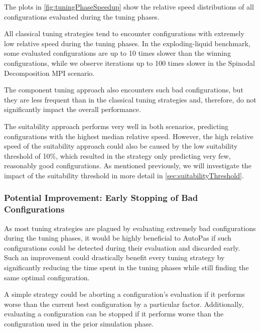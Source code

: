 The plots in \autoref{fig:tuningPhaseSpeedup} show the relative speed distributions of all configurations evaluated during the tuning phases.

All classical tuning strategies tend to encounter configurations with extremely low relative speed during the tuning phases. In the exploding-liquid benchmark, some evaluated configurations are up to 10 times slower than the winning configurations, while we observe iterations up to 100 times slower in the Spinodal Decomposition MPI scenario.

The component tuning approach also encounters such bad configurations, but they are less frequent than in the classical tuning strategies and, therefore, do not significantly impact the overall performance.

The suitability approach performs very well in both scenarios, predicting configurations with the highest median relative speed. However, the high relative speed of the suitability approach could also be caused by the low suitability threshold of 10\%, which resulted in the strategy only predicting very few, reasonably good configurations. As mentioned previously, we will investigate the impact of the suitability threshold in more detail in \autoref{sec:suitabilityThreshold}.

\subsubsection{Potential Improvement: Early Stopping of Bad Configurations}
\label{sec:earlyStopping}

As most tuning strategies are plagued by evaluating extremely bad configurations during the tuning phases, it would be highly beneficial to AutoPas if such configurations could be detected during their evaluation and discarded early. Such an improvement could drastically benefit every tuning strategy by significantly reducing the time spent in the tuning phases while still finding the same optimal configuration.

A simple strategy could be aborting a configuration's evaluation if it performs worse than the current best configuration by a particular factor. Additionally, evaluating a configuration can be stopped if it performs worse than the configuration used in the prior simulation phase.

